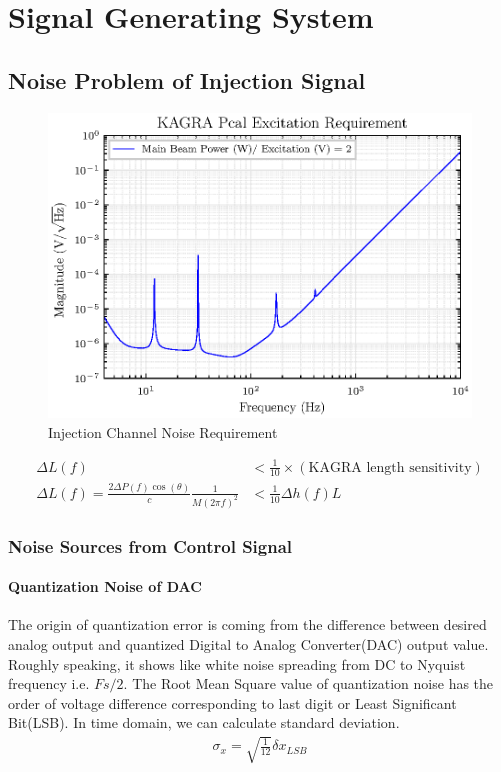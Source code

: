 \chapter{Signal Generating System}

\section{Noise Problem of Injection Signal}


\begin{figure}[hbt!]
\centering
\includegraphics[width=.9\textwidth]{figure/DAC_requirement.eps}
\caption{Injection Channel Noise Requirement}\label{fig:DAC_noise_requirement}
\end{figure}

\begin{align}
   \Delta L(f) &< \frac{1}{10} \times (\text{KAGRA length sensitivity})\\
   \Delta L(f) =\frac{2 \Delta P(f) \cos(\theta)}{c} \frac{1}{M(2 \pi f)^2} &< \frac{1}{10} \Delta h(f) L
\end{align}




\subsection{Noise Sources from Control Signal}
\subsubsection{Quantization Noise of DAC}


The origin of quantization error is coming from the difference between desired analog output and quantized Digital to Analog Converter(DAC) output value. Roughly speaking, it shows like white noise spreading from DC to Nyquist frequency i.e. $Fs/2$.
The Root Mean Square value of quantization noise has the order of voltage difference corresponding to last digit or Least Significant Bit(LSB). In time domain, we can calculate standard deviation.
\begin{align}
   \sigma_x = \sqrt{\frac{1}{12}} \delta x_{LSB}
\end{align}

